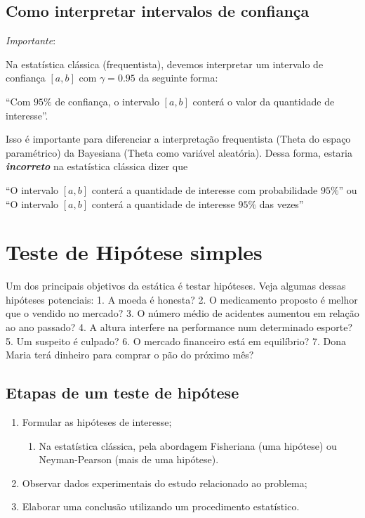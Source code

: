 \documentclass[
  letterpaper,
  DIV=11,
  numbers=noendperiod]{scrreprt}
\providecommand{\tightlist}{%
  \setlength{\itemsep}{0pt}\setlength{\parskip}{0pt}}\usepackage{longtable,booktabs,array}
\begin{document}
\section{Como interpretar intervalos de
confiança}\label{como-interpretar-intervalos-de-confianuxe7a}

\emph{Importante}:

Na estatística clássica (frequentista), devemos interpretar um intervalo
de confiança \([a,b]\) com \(\gamma=0.95\) da seguinte forma:

``Com \(95\%\) de confiança, o intervalo \([a,b]\) conterá o valor da
quantidade de interesse''.

Isso é importante para diferenciar a interpretação frequentista (Theta
do espaço paramétrico) da Bayesiana (Theta como variável aleatória).
Dessa forma, estaria \textbf{\emph{incorreto}} na estatística clássica
dizer que

``O intervalo \([a,b]\) conterá a quantidade de interesse com
probabilidade \(95\%\)'' ou ``O intervalo \([a,b]\) conterá a quantidade
de interesse \(95\%\) das vezes''


\chapter{Teste de Hipótese simples}\label{teste-de-hipuxf3tese-simples}

Um dos principais objetivos da estática é testar hipóteses. Veja algumas
dessas hipóteses potenciais: 1. A moeda é honesta? 2. O medicamento
proposto é melhor que o vendido no mercado? 3. O número médio de
acidentes aumentou em relação ao ano passado? 4. A altura interfere na
performance num determinado esporte? 5. Um suspeito é culpado? 6. O
mercado financeiro está em equilíbrio? 7. Dona Maria terá dinheiro para
comprar o pão do próximo mês?

\section{Etapas de um teste de
hipótese}\label{etapas-de-um-teste-de-hipuxf3tese}

\begin{enumerate}
\def\labelenumi{\arabic{enumi}.}
\tightlist
\item
  Formular as hipóteses de interesse;

  \begin{enumerate}
  \def\labelenumii{\arabic{enumii}.}
  \tightlist
  \item
    Na estatística clássica, pela abordagem Fisheriana (uma hipótese) ou
    Neyman-Pearson (mais de uma hipótese).
  \end{enumerate}
\item
  Observar dados experimentais do estudo relacionado ao problema;
\item
  Elaborar uma conclusão utilizando um procedimento estatístico.
\end{enumerate}
\end{document}
